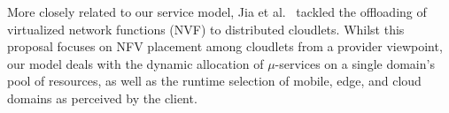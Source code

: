 
More closely related to our service model, Jia et al.~\cite{Jia:2017} tackled the offloading of  virtualized network functions (NVF) to distributed cloudlets. Whilst this proposal focuses on NFV placement among cloudlets from a provider viewpoint, our model deals with the dynamic allocation of $\mu$-services on a single domain's pool of resources, as well as the runtime selection of mobile, edge, and cloud domains as perceived by the client. %

